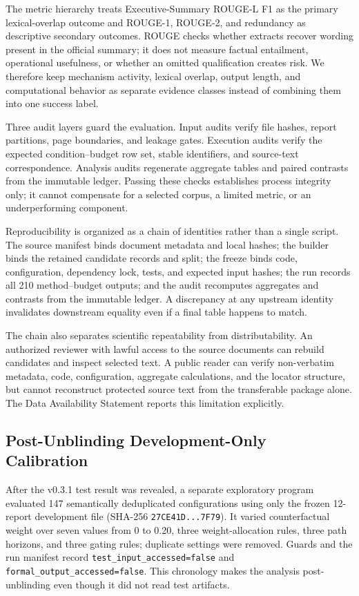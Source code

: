 \documentclass[applsci,article,submit,moreauthors]{Definitions/mdpi}
\begin{document}
The metric hierarchy treats Executive-Summary ROUGE-L F1 as the primary lexical-overlap outcome and ROUGE-1, ROUGE-2, and redundancy as descriptive secondary outcomes. ROUGE checks whether extracts recover wording present in the official summary; it does not measure factual entailment, operational usefulness, or whether an omitted qualification creates risk. We therefore keep mechanism activity, lexical overlap, output length, and computational behavior as separate evidence classes instead of combining them into one success label.

Three audit layers guard the evaluation. Input audits verify file hashes, report partitions, page boundaries, and leakage gates. Execution audits verify the expected condition--budget row set, stable identifiers, and source-text correspondence. Analysis audits regenerate aggregate tables and paired contrasts from the immutable ledger. Passing these checks establishes process integrity only; it cannot compensate for a selected corpus, a limited metric, or an underperforming component.

Reproducibility is organized as a chain of identities rather than a single script. The source manifest binds document metadata and local hashes; the builder binds the retained candidate records and split; the freeze binds code, configuration, dependency lock, tests, and expected input hashes; the run records all 210 method--budget outputs; and the audit recomputes aggregates and contrasts from the immutable ledger. A discrepancy at any upstream identity invalidates downstream equality even if a final table happens to match.

The chain also separates scientific repeatability from distributability. An authorized reviewer with lawful access to the source documents can rebuild candidates and inspect selected text. A public reader can verify non-verbatim metadata, code, configuration, aggregate calculations, and the locator structure, but cannot reconstruct protected source text from the transferable package alone. The Data Availability Statement reports this limitation explicitly.

\subsection{Post-Unblinding Development-Only Calibration}

After the v0.3.1 test result was revealed, a separate exploratory program evaluated 147 semantically deduplicated configurations using only the frozen 12-report development file (SHA-256 \texttt{27CE41D...7F79}). It varied counterfactual weight over seven values from 0 to 0.20, three weight-allocation rules, three path horizons, and three gating rules; duplicate settings were removed. Guards and the run manifest record \texttt{test\_input\_accessed=false} and \texttt{formal\_output\_accessed=false}. This chronology makes the analysis post-unblinding even though it did not read test artifacts.
\end{document}
